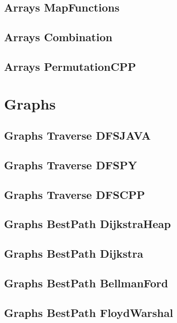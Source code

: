 \subsection{Arrays MapFunctions}
\raggedbottom
\hrulefill
\subsection{Arrays Combination}
\raggedbottom
\hrulefill
\subsection{Arrays PermutationCPP}
\raggedbottom
\hrulefill

\section{Graphs}
\subsection{Graphs Traverse DFSJAVA}
\raggedbottom
\hrulefill
\subsection{Graphs Traverse DFSPY}
\raggedbottom
\hrulefill
\subsection{Graphs Traverse DFSCPP}
\raggedbottom
\hrulefill
\subsection{Graphs BestPath DijkstraHeap}
\raggedbottom
\hrulefill
\subsection{Graphs BestPath Dijkstra}
\raggedbottom
\hrulefill
\subsection{Graphs BestPath BellmanFord}
\raggedbottom
\hrulefill
\subsection{Graphs BestPath FloydWarshal}
\raggedbottom
\hrulefill

